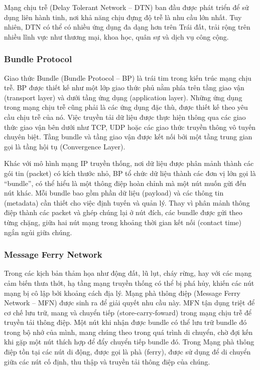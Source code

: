 \documentclass[a4paper]{article}
\begin{document}
Mạng chịu trễ (Delay Tolerant Network – DTN) ban đầu được phát triển để sử dụng liên hành tinh, nơi khả năng chịu đựng độ trễ là nhu cầu lớn nhất. Tuy nhiên, DTN có thể có nhiều ứng dụng đa dạng hơn trên Trái đất, trải rộng trên nhiều lĩnh vực như thương mại, khoa học, quân sự và dịch vụ công cộng.

\subsubsection{Bundle Protocol}
Giao thức Bundle (Bundle Protocol – BP) là trái tim trong kiến trúc mạng chịu trễ. BP được thiết kế như một lớp giao thức phủ nằm phía trên tầng giao vận (transport layer) và dưới tầng ứng dụng (application layer). Những ứng dụng trong mạng chịu trễ cũng phải là các ứng dụng đặc thù, được thiết kế theo yêu cầu chịu trễ của nó.
Việc truyền tải dữ liệu được thực hiện thông qua các giao thức giao vận bên dưới như TCP, UDP hoặc các giao thức truyền thông vô tuyến chuyên biệt. Tầng bundle và tầng giao vận được kết nối bởi một tầng trung gian gọi là tầng hội tụ (Convergence Layer).

Khác với mô hình mạng IP truyền thống, nơi dữ liệu được phân mảnh thành các gói tin (packet) có kích thước nhỏ, BP tổ chức dữ liệu thành các đơn vị lớn gọi là “bundle”, có thể hiểu là một thông điệp hoàn chỉnh mà một nút muốn gửi đến nút khác. 
Mỗi bundle bao gồm phần dữ liệu (payload) và các thông tin (metadata) cần thiết cho việc định tuyến và quản lý.
Thay vì phân mảnh thông điệp thành các packet và ghép chúng lại ở nút đích, các bundle được gửi theo từng chặng, giữa hai nút mạng trong khoảng thời gian kết nối (contact time) ngắn ngủi giữa chúng. 

\subsubsection{Message Ferry Network}
Trong các kịch bản thảm họa như động đất, lũ lụt, cháy rừng, hay với các mạng cảm biến thưa thớt, hạ tầng mạng truyền thống có thể bị phá hủy, khiến các nút mạng bị cô lập bởi khoảng cách địa lý.
Mạng phà thông điệp (Message Ferry Network – MFN) được sinh ra để giải quyết nhu cầu này. 
MFN tận dụng triệt để cơ chế lưu trữ, mang và chuyển tiếp (store-carry-foward) trong mạng chịu trễ để truyền tải thông điệp. Một nút khi nhận được bundle có thể lưu trữ bundle đó trong bộ nhớ của mình, mang chúng theo trong quá trình di chuyển, chờ đợi kến khi gặp một nút thích hợp để đẩy chuyển tiếp bundle đó. Trong Mạng phà thông điệp tồn tại các nút di động, được gọi là phà (ferry), được sử dụng để di chuyển giữa các nút cố định, thu thập và truyền tải thông điệp của chúng. 
\end{document}
